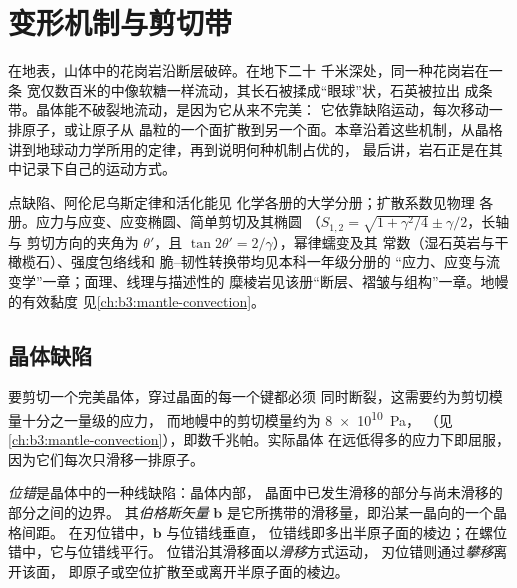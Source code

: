 \chapter{变形机制与剪切带}\label{ch:b3:deformation-mechanisms}

在地表，山体中的花岗岩沿断层破碎。在地下二十
千米深处，同一种花岗岩在一条
宽仅数百米的中像软糖一样流动，其长石被揉成“眼球”状，石英被拉出
成条带。晶体能不破裂地流动，是因为它从来不完美：
它依靠缺陷运动，每次移动一排原子，或让原子从
晶粒的一个面扩散到另一个面。本章沿着这些机制，从晶格
讲到地球动力学所用的定律，再到说明何种机制占优的，
最后讲，岩石正是在其中记录下自己的运动方式。

\begin{recall}
点缺陷、阿伦尼乌斯定律和活化能见
化学各册的大学分册；扩散系数见物理
各册。应力与应变、应变椭圆、简单剪切及其椭圆
（$S_{1,2} = \sqrt{1 + \gamma^2/4} \pm \gamma/2$，长轴与
剪切方向的夹角为 $\theta'$，且 $\tan2\theta' = 2/\gamma$），幂律蠕变及其
常数（湿石英岩与干橄榄石）、强度包络线和
脆–韧性转换带均见本科一年级分册的
“应力、应变与流变学”一章；面理、线理与描述性的
糜棱岩见该册“断层、褶皱与组构”一章。地幔的有效黏度
见\cref{ch:b3:mantle-convection}。
\end{recall}

\section{晶体缺陷}

要剪切一个完美晶体，穿过晶面的每一个键都必须
同时断裂，这需要约为剪切模量十分之一量级的应力，
而地幔中的剪切模量约为 \qty{8e10}{Pa}，
（见\cref{ch:b3:mantle-convection}），即数千兆帕。实际晶体
在远低得多的应力下即屈服，因为它们每次只滑移一排原子。

\begin{definition}[位错]\label{def:b3:deformation-mechanisms:dislocation}
\emph{位错}是晶体中的一种线缺陷：晶体内部，
晶面中已发生滑移的部分与尚未滑移的部分之间的边界。
其\emph{伯格斯矢量}
$\mathbf b$ 是它所携带的滑移量，即沿某一晶向的一个晶格间距。
在刃位错中，$\mathbf b$ 与位错线垂直，
位错线即多出半原子面的棱边；在螺位错中，它与位错线平行。
位错沿其滑移面以\emph{滑移}方式运动，
刃位错则通过\emph{攀移}离开该面，
即原子或空位扩散至或离开半原子面的棱边。
\end{definition}

